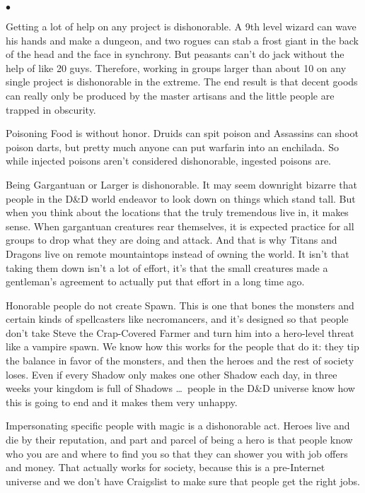 \begin{list}{$\bullet$}{\itemspace}
    \item Getting a lot of help on any project is dishonorable. A 9th level wizard can wave his hands and make a dungeon, and two rogues can stab a frost giant in the back of the head and the face in synchrony. But peasants can't do jack without the help of like 20 guys. Therefore, working in groups larger than about 10 on any single project is dishonorable in the extreme. The end result is that decent goods can really only be produced by the master artisans and the little people are trapped in obscurity.
    \item Poisoning Food is without honor. Druids can spit poison and Assassins can shoot poison darts, but pretty much anyone can put warfarin into an enchilada. So while injected poisons aren't considered dishonorable, ingested poisons are.
    \item Being Gargantuan or Larger is dishonorable. It may seem downright bizarre that people in the D\&D world endeavor to look down on things which stand tall. But when you think about the locations that the truly tremendous live in, it makes sense. When gargantuan creatures rear themselves, it is expected practice for all groups to drop what they are doing and attack. And that is why Titans and Dragons live on remote mountaintops instead of owning the world. It isn't that taking them down isn't a lot of effort, it's that the small creatures made a gentleman's agreement to actually put that effort in a long time ago.
    \item Honorable people do not create Spawn. This is one that bones the monsters and certain kinds of spellcasters like necromancers, and it's designed so that people don't take Steve the Crap-Covered Farmer and turn him into a hero-level threat like a vampire spawn. We know how this works for the people that do it: they tip the balance in favor of the monsters, and then the heroes and the rest of society loses. Even if every Shadow only makes one other Shadow each day, in three weeks your kingdom is full of Shadows \ldots\ people in the D\&D universe know how this is going to end and it makes them very unhappy.
    \item Impersonating specific people with magic is a dishonorable act. Heroes live and die by their reputation, and part and parcel of being a hero is that people know who you are and where to find you so that they can shower you with job offers and money. That actually works for society, because this is a pre-Internet universe and we don't have Craigslist to make sure that people get the right jobs.

\end{list}
